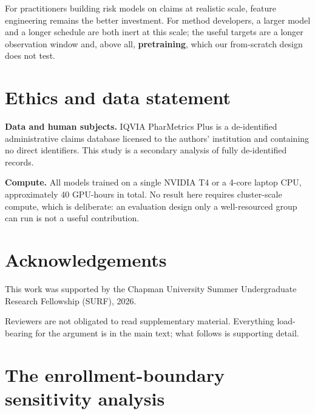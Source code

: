 \documentclass[10pt,twocolumn,letterpaper]{article}
\begin{document}
For practitioners building risk models on claims at realistic scale, feature engineering remains the better investment. For method developers, a larger model and a longer schedule are both inert at this scale; the useful targets are a longer observation window and, above all, \textbf{pretraining}, which our from-scratch design does not test.







\section*{Ethics and data statement}



\textbf{Data and human subjects.} IQVIA PharMetrics Plus is a de-identified administrative claims database licensed to the authors' institution and containing no direct identifiers. This study is a secondary analysis of fully de-identified records.



\textbf{Compute.} All models trained on a single NVIDIA T4 or a 4-core laptop CPU, approximately 40 GPU-hours in total. No result here requires cluster-scale compute, which is deliberate: an evaluation design only a well-resourced group can run is not a useful contribution.







\section*{Acknowledgements}



This work was supported by the Chapman University Summer Undergraduate Research Fellowship (SURF), 2026.





\label{main:end}

\onecolumn\label{app:start}\appendix



Reviewers are not obligated to read supplementary material. Everything load-bearing for the argument is in the main text; what follows is supporting detail.



\section{The enrollment-boundary sensitivity analysis}
\end{document}
